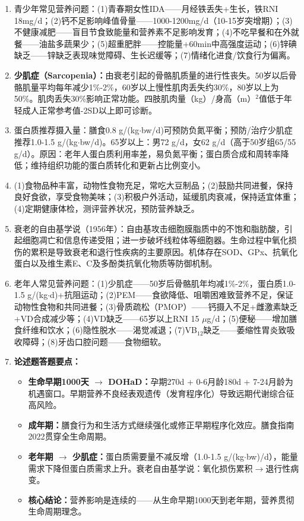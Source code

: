 {\begin{enumerate}[leftmargin=*, itemsep=5pt]
    \item 青少年常见营养问题：(1)青春期女性IDA——月经铁丢失+生长，铁RNI 18mg/d；(2)钙不足影响峰值骨量——1000-1200mg/d（10-15岁突增期）；(3)不健康减肥——盲目节食致能量和营养素不足影响发育；(4)不吃早餐和在外就餐——油盐多蔬果少；(5)超重肥胖——控能量+60min中高强度运动；(6)锌碘缺乏——锌缺乏表现味觉障碍、生长迟缓等；(7)情绪化进食/饮食行为偏离。
    \item \textbf{少肌症（Sarcopenia）：}由衰老引起的骨骼肌质量的进行性丧失。50岁以后骨骼肌量平均每年减少1\%-2\%，60岁以上慢性肌肉丢失约30\%，80岁以上为50\%。肌肉丢失30\%影响正常功能。四肢肌肉量（kg）/身高（m）$^2$值低于年轻成人正常参考值-2SD以上即可诊断。
    \item 蛋白质推荐摄入量：膳食0.8 g/(kg$\cdot$bw/d)可预防负氮平衡；预防/治疗少肌症推荐1.0-1.5 g/(kg$\cdot$bw/d)。65岁以上：男72 g/d，女62 g/d（高于50岁组65/55 g/d）。原因：老年人蛋白质利用率差，易负氮平衡；蛋白质合成和周转率降低；维持组织功能的蛋白质转化和更新占比例变小。
    \item (1)食物品种丰富，动物性食物充足，常吃大豆制品；(2)鼓励共同进餐，保持良好食欲，享受食物美味；(3)积极户外活动，延缓肌肉衰减，保持适宜体重；(4)定期健康体检，测评营养状况，预防营养缺乏。
    \item 衰老的自由基学说（1956年）：自由基攻击细胞膜脂质中的不饱和脂肪酸，引起细胞凋亡和信息传递受阻；进一步破坏线粒体等细胞器。生命过程中氧化损伤的累积是导致衰老和退行性疾病的主要原因。机体存在SOD、GPx、抗氧化蛋白以及维生素E、C及多酚类抗氧化物质等防御机制。
    \item 老年人常见营养问题：(1)少肌症——50岁后骨骼肌年均减1\%-2\%，蛋白质1.0-1.5 g/(kg$\cdot$d)+抗阻运动；(2)PEM——食欲降低、咀嚼困难致营养不足，保证动物性食物和共同进餐；(3)骨质疏松（PMOP）——钙摄入不足+雌激素缺乏+VD合成减少等；(4)VD缺乏——65岁以上RNI 15 $\mu$g/d；(5)便秘——增加膳食纤维和饮水；(6)隐性脱水——渴觉减退；(7)VB$_{12}$缺乏——萎缩性胃炎致吸收障碍；(8)牙齿口腔问题——食物细软。
    \item \textbf{论述题答题要点：}
    \begin{itemize}[leftmargin=*]
        \item \textbf{生命早期1000天 $\rightarrow$ DOHaD：}孕期270d + 0-6月龄180d + 7-24月龄为机遇窗口。早期营养不良经表观遗传（发育程序化）导致远期代谢综合征高风险。
        \item \textbf{成年期：}膳食行为和生活方式继续强化或修正早期程序化效应。膳食指南2022贯穿全生命周期。
        \item \textbf{老年期 $\rightarrow$ 少肌症：}蛋白质需要量不减反增（1.0-1.5 g/(kg$\cdot$bw)/d），能量需求下降但蛋白质需求上升。衰老自由基学说：氧化损伤累积$\rightarrow$退行性病变。
        \item \textbf{核心结论：}营养影响是连续的——从生命早期1000天到老年期，营养贯彻生命周期理念。
    \end{itemize}


\end{enumerate}}
